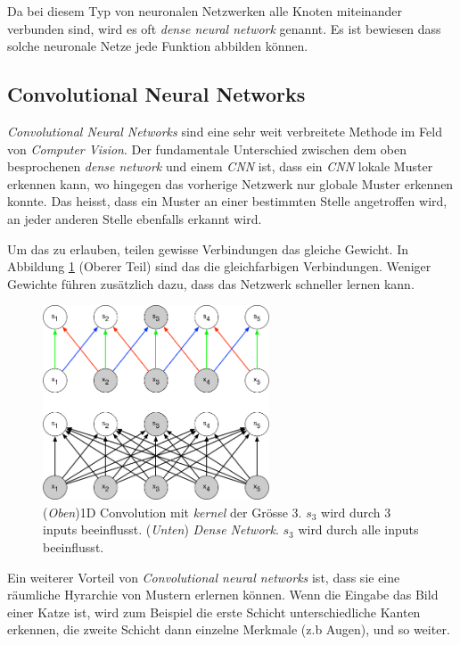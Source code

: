 Da bei diesem Typ von neuronalen Netzwerken alle Knoten miteinander verbunden sind, wird es oft \textit{dense neural network} genannt.
Es ist bewiesen dass solche neuronale Netze jede Funktion abbilden können\parencite[][Kap. 4]{universal}.


\subsection{Convolutional Neural Networks}
\textit{Convolutional Neural Networks} sind eine sehr weit verbreitete Methode im Feld von \textit{Computer Vision}. Der fundamentale Unterschied zwischen dem oben besprochenen \textit{dense network} und einem \textit{CNN} ist, dass ein \textit{CNN} lokale Muster erkennen kann, wo hingegen das vorherige Netzwerk nur globale Muster erkennen konnte. Das heisst, dass ein Muster an einer bestimmten Stelle angetroffen wird, an jeder anderen Stelle ebenfalls erkannt wird. \parencite{chollet}

Um das zu erlauben, teilen gewisse Verbindungen das gleiche Gewicht. In Abbildung \ref{img:conv} (Oberer Teil) sind das die gleichfarbigen Verbindungen. Weniger Gewichte führen zusätzlich dazu, dass das Netzwerk schneller lernen kann.
\begin{figure}[hbt]
	\centering
		\includegraphics[width=0.6\textwidth]{assets/conv_1d.png}
	\caption{(\textit{Oben})1D Convolution mit \textit{kernel} der Grösse 3. $s_3$ wird durch 3 inputs beeinflusst.
		     (\textit{Unten}) \textit{Dense Network}. $s_3$ wird durch alle inputs beeinflusst.\parencite{goodfellow}}
	\label{img:conv}
\end{figure}

Ein weiterer Vorteil von \textit{Convolutional neural networks} ist, dass sie eine räumliche Hyrarchie von Mustern erlernen können. Wenn die Eingabe das Bild einer Katze ist, wird zum Beispiel die erste Schicht unterschiedliche Kanten erkennen, die zweite Schicht dann einzelne Merkmale (z.b Augen), und so weiter.

